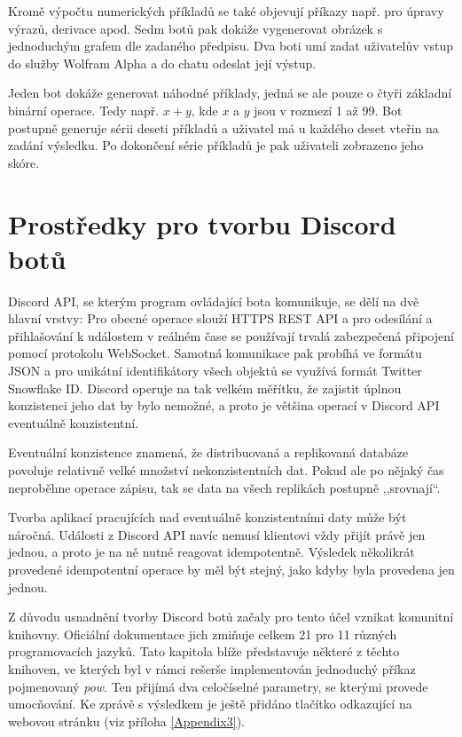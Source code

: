 \documentclass[FM]{tulthesis}
\begin{document}
	Kromě výpočtu numerických příkladů se také objevují příkazy např. pro úpravy výrazů, derivace apod. Sedm botů pak dokáže vygenerovat obrázek s jednoduchým grafem dle zadaného předpisu. Dva boti umí zadat uživatelův vstup do služby Wolfram Alpha a do chatu odeslat její výstup.
	
	Jeden bot dokáže generovat náhodné příklady, jedná se ale pouze o čtyři základní binární operace. Tedy např. $x+y$, kde $x$ a $y$ jsou v rozmezí 1 až 99. Bot postupně generuje sérii deseti příkladů a uživatel má u každého deset vteřin na zadání výsledku. Po dokončení série příkladů je pak uživateli zobrazeno jeho skóre.
	
	
	\chapter{Prostředky pro tvorbu Discord botů}\label{Chapter4}
		
	Discord API, se kterým program ovládající bota komunikuje, se dělí na dvě hlavní vrstvy: Pro obecné operace slouží HTTPS REST API a pro odesílání a přihlašování k událostem v reálném čase se používají trvalá zabezpečená připojení pomocí protokolu WebSocket. Samotná komunikace pak probíhá ve formátu JSON a pro unikátní identifikátory všech objektů se využívá formát Twitter Snowflake ID. \mbox{Discord} operuje na tak velkém měřítku, že zajistit úplnou konzistenci jeho dat by bylo nemožné, a proto je většina operací v Discord API eventuálně konzistentní. \cite{doc_Discord}
	
	Eventuální konzistence znamená, že distribuovaná a replikovaná databáze povoluje relativně velké množství nekonzistentních dat. Pokud ale po nějaký čas neproběhne operace zápisu, tak se data na všech replikách postupně ,,srovnají``. \cite{book_distributedSystems4}
	
	Tvorba aplikací pracujících nad eventuálně konzistentními daty může být náročná. Události z Discord API navíc nemusí klientovi vždy přijít právě jen jednou, a proto je na ně nutné reagovat idempotentně. Výsledek několikrát provedené idempotentní operace by měl být stejný, jako kdyby byla provedena jen jednou. \cite{book_distributedSystemsUnderstanding}
	
	Z důvodu usnadnění tvorby Discord botů začaly pro tento účel vznikat komunitní knihovny. Oficiální dokumentace jich zmiňuje celkem 21 pro 11 různých programovacích jazyků. Tato kapitola blíže představuje některé z těchto knihoven, ve kterých byl v rámci rešerše implementován jednoduchý příkaz pojmenovaný \textit{pow}. Ten přijímá dva celočíselné parametry, se kterými provede umocňování. Ke zprávě s výsledkem je ještě přidáno tlačítko odkazující na webovou stránku (viz příloha \ref{Appendix3}).
	
\end{document}
